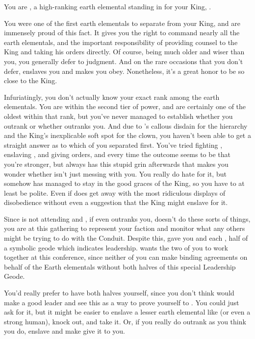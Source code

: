 \documentclass[char]{elementals}
\begin{document}
\name{\cLoyal{}}

You are \cLoyal{\intro}, a high-ranking earth elemental standing in for your King, \cEarthKing{}.

You were one of the first earth elementals to separate from your King, and are immensely proud of this fact.  It gives you the right to command nearly all the earth elementals, and the important responsibility of providing counsel to the King and taking his orders directly.  Of course, \cEarthKing{\they} being much older and wiser than you, you generally defer to \cEarthKing{\their} judgment.  And on the rare occasions that you don't defer, \cEarthKing{\they} enslaves you and makes you obey.  Nonetheless, it's a great honor to be so close to the King.

Infuriatingly, you don't actually know your exact rank among the earth elementals.  You are within the second tier of power, and are certainly one of the oldest within that rank, but you've never managed to establish whether you outrank \cRogue{\intro} or whether \cRogue{\they} outranks you.  And due to \cRogue{}'s callous disdain for the hierarchy and the King's inexplicable soft spot for the clown, you haven't been able to get a straight answer as to which of you separated first.  You've tried fighting \cRogue{}, enslaving \cRogue{\them}, and giving \cRogue{\them} orders, and every time the outcome seems to be that you're stronger, but \cRogue{\they} always has this stupid grin afterwards that makes you wonder whether \cRogue{\they} isn't just messing with you.  You really do hate \cRogue{\them} for it, but somehow \cRogue{\they} has managed to stay in the good graces of the King, so you have to at least be polite.  Even if \cRogue{\they} does get away with the most ridiculous displays of disobedience without even a suggestion that the King might enslave \cRogue{\them} for it.

Since \cEarthKing{} is not attending and \cRogue{}, if \cRogue{\they} even outranks you, doesn't do these sorts of things, you are at this gathering to represent your faction and monitor what any others might be trying to do with the Conduit.  Despite this, \cEarthKing{} gave you and \cRogue{} each \iHalfGeode{}, half of a symbolic geode which indicates leadership.  \cEarthKing{} wants the two of you to work together at this conference, since neither of you can make binding agreements on behalf of the Earth elementals without both halves of this special Leadership Geode.

You'd really prefer to have both halves yourself, since you don't think \cRogue{} would make a good leader and see this as a way to prove yourself to \cEarthKing{}.  You could just ask \cRogue{} for it, but it might be easier to enslave a lesser earth elemental like \cMinion{} (or even a strong human), knock \cRogue{\them} out, and take it.  Or, if you really do outrank \cRogue{} as you think you do, enslave \cRogue{\them} and make \cRogue{\them} give it to you.
\end{document}
